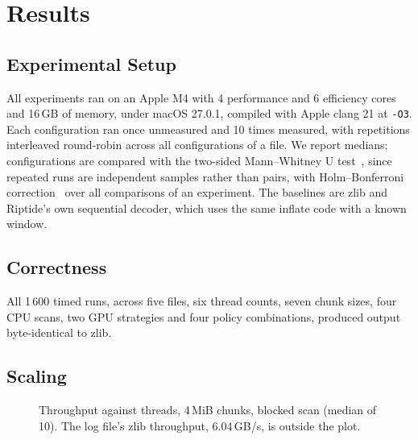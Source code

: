 \documentclass[conference]{IEEEtran}
\begin{document}
\section{Results}

\subsection{Experimental Setup}

All experiments ran on an Apple M4 with 4 performance and 6 efficiency cores and
16\,GB of memory, under macOS 27.0.1, compiled with Apple clang 21 at \texttt{-O3}.
Each configuration ran once unmeasured and 10 times measured, with repetitions
interleaved round-robin across all configurations of a file. We report medians;
configurations are compared with the two-sided Mann--Whitney U
test~\cite{mannwhitney}, since repeated runs are independent samples rather than
pairs, with Holm--Bonferroni correction~\cite{holm} over all comparisons of an
experiment. The baselines are zlib and Riptide's own sequential decoder, which uses
the same inflate code with a known window.

\subsection{Correctness}

All 1\,600 timed runs, across five files, six thread counts, seven chunk sizes, four
CPU scans, two GPU strategies and four policy combinations, produced output
byte-identical to zlib.

\subsection{Scaling}

\begin{figure}[t]
\centering
{}
\caption{Throughput against threads, 4\,MiB chunks, blocked scan (median of 10).
The log file's zlib throughput, 6.04\,GB/s, is outside the plot.}
\label{fig:scaling}
\end{figure}
\end{document}
